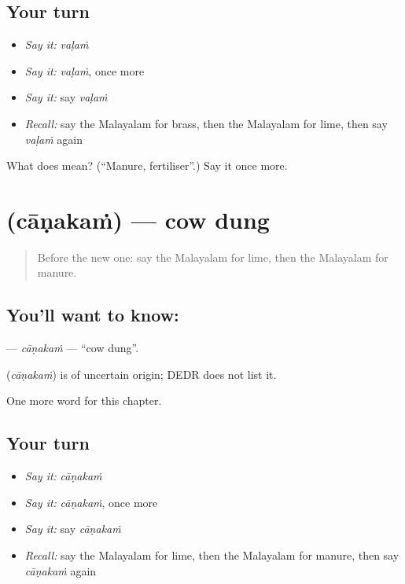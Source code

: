 \subsection*{Your turn}
\begin{itemize}
\raggedright
  \item \emph{Say it:} \emph{vaḷaṁ}
  \item \emph{Say it:} \emph{vaḷaṁ}, once more
  \item \emph{Say it:} say \emph{vaḷaṁ}
  \item \emph{Recall:} say the Malayalam for brass, then the Malayalam for lime, then say \emph{vaḷaṁ} again
\end{itemize}

\begin{tcolorbox}[breakable,colback=teal!4,colframe=teal!35!black,title={Before you move on}]
What does  mean? (\textquotedblleft{}Manure, fertiliser\textquotedblright{}.) Say it once more.
\end{tcolorbox}
\section[\texorpdfstring{\ml{ചാണകം} (cāṇakaṁ)}{ചാണകം (cāṇakaṁ)}]{ (cāṇakaṁ) — cow dung}

\label{lesson:ML-C218-canakam}



\begin{quote}
Before the new one: say the Malayalam for lime, then the Malayalam for manure.
\end{quote}

\subsection*{You'll want to know: }
\textbf{} — \emph{cāṇakaṁ} — \textquotedblleft{}cow dung\textquotedblright{}.

\begin{cousinweb}
\textbf{} (\emph{cāṇakaṁ}) is of uncertain origin; DEDR does not list it.
\end{cousinweb}

\begin{grammarlens}[title={What you've built}]
One more word for this chapter.
\end{grammarlens}

\subsection*{Your turn}
\begin{itemize}
\raggedright
  \item \emph{Say it:} \emph{cāṇakaṁ}
  \item \emph{Say it:} \emph{cāṇakaṁ}, once more
  \item \emph{Say it:} say \emph{cāṇakaṁ}
  \item \emph{Recall:} say the Malayalam for lime, then the Malayalam for manure, then say \emph{cāṇakaṁ} again
\end{itemize}

